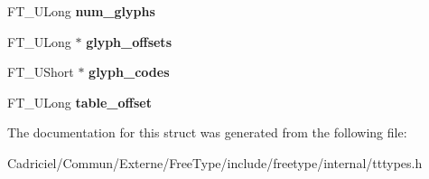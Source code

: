 \begin{DoxyCompactItemize}
\item 
F\+T\+\_\+\+U\+Long {\bfseries num\+\_\+glyphs}\hypertarget{struct_t_t___s_bit___range_rec___afd9437150f8d9f784f98da6d61223464}{}\label{struct_t_t___s_bit___range_rec___afd9437150f8d9f784f98da6d61223464}

\item 
F\+T\+\_\+\+U\+Long $\ast$ {\bfseries glyph\+\_\+offsets}\hypertarget{struct_t_t___s_bit___range_rec___a475f649f101b5886cc2443934e6aa9ca}{}\label{struct_t_t___s_bit___range_rec___a475f649f101b5886cc2443934e6aa9ca}

\item 
F\+T\+\_\+\+U\+Short $\ast$ {\bfseries glyph\+\_\+codes}\hypertarget{struct_t_t___s_bit___range_rec___ad40d4aa7e48bdb4ab8c98850f1bba178}{}\label{struct_t_t___s_bit___range_rec___ad40d4aa7e48bdb4ab8c98850f1bba178}

\item 
F\+T\+\_\+\+U\+Long {\bfseries table\+\_\+offset}\hypertarget{struct_t_t___s_bit___range_rec___a54457937305b5ccf895f5b23c0cc6006}{}\label{struct_t_t___s_bit___range_rec___a54457937305b5ccf895f5b23c0cc6006}

\end{DoxyCompactItemize}


The documentation for this struct was generated from the following file\+:\begin{DoxyCompactItemize}
\item 
Cadriciel/\+Commun/\+Externe/\+Free\+Type/include/freetype/internal/tttypes.\+h\end{DoxyCompactItemize}
